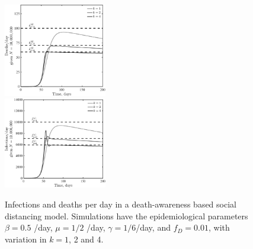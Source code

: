 \begin{figure}[t!]
\begin{center}
\includegraphics[width=0.4\textwidth]{scripts/figseir_baseplat_k2_D_noname.pdf}\\
\includegraphics[width=0.4\textwidth]{scripts/figseir_baseplat_k2_I_noname.pdf}
\caption{Infections and deaths per day in a death-awareness based
social distancing model.  Simulations have the
epidemiological parameters 
$\beta=0.5$ /day, $\mu=1/2$ /day, $\gamma=1/6$/day,
and $f_D=0.01$, with variation in $k=1$, 2 and 4. 
\label{fig.ID_day}}
\end{center}
\end{figure}

